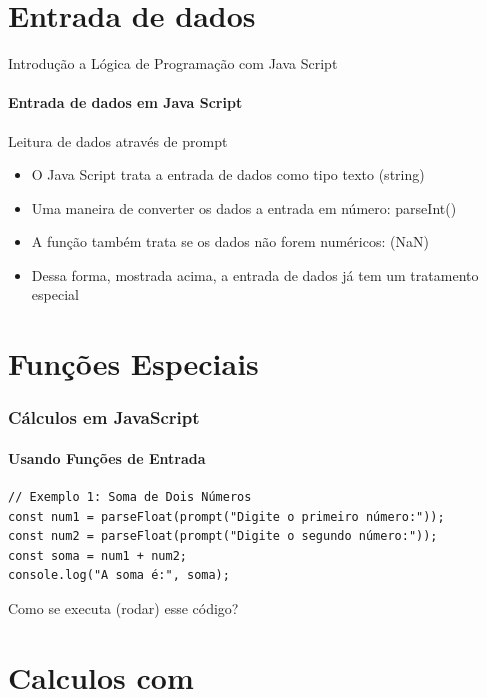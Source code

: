 \documentclass[13pt, xcolor={dvipsnames,svgnames}, portuguese]{beamer}
\begin{document}
\section{Entrada de dados}
\begin{frame}{Introdução a Lógica de Programação com Java Script}
\framesubtitle{ Entrada de dados em Java Script}
	\begin{block}{Leitura de dados através de prompt}
		\begin{itemize}
		  \item[a.] O Java Script trata a entrada de dados como tipo texto (string)
		  \pause
		  \item[b.] Uma maneira de converter os dados a entrada em número: parseInt()
		   \pause		  
		  \item[c.] A função também trata se os dados não forem numéricos: (NaN)
		  \pause
		  \item[d.] Dessa forma, mostrada acima, a entrada de dados já tem um tratamento especial
		\end{itemize}
	\end{block} 
\end{frame}


\section{Funções Especiais}

\begin{frame}[fragile]
\frametitle{Cálculos em JavaScript}
\framesubtitle{Usando Funções de Entrada}

\begin{verbatim}
// Exemplo 1: Soma de Dois Números
const num1 = parseFloat(prompt("Digite o primeiro número:"));
const num2 = parseFloat(prompt("Digite o segundo número:"));
const soma = num1 + num2;
console.log("A soma é:", soma);
\end{verbatim}
Como se executa (rodar) esse código?
\end{frame}

\section{Calculos com }
\end{document}
